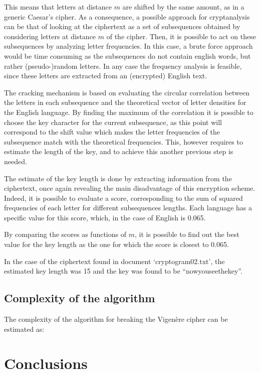 \documentclass[12pt]{article}
\begin{document}
This means that letters at distance $m$ are shifted by the same amount, as in a generic Caesar's cipher.
As a consequence, a possible approach for cryptanalysis can be that of looking at the ciphertext as a set of subsequences obtained by considering letters at distance $m$ of the cipher. 
Then, it is possible to act on these subsequences by analyzing letter frequencies. In this case, a brute force approach would be time consuming as the subsequences do not contain english words, but rather (pseudo-)random letters. 
In any case the frequency analysis is feasible, since these letters are extracted from an (encrypted) English text.

The cracking mechanism is based on evaluating the circular correlation between the letters in each subsequence and the theoretical vector of letter densities for the English language. 
By finding the maximum of the correlation it is possible to choose the key character for the current subsequence, as this point will correspond to the shift value which makes the letter frequencies of the subsequence match with the theoretical frequencies.
This, however requires to estimate the length of the key, and to achieve this another previous step is needed.

The estimate of the key length is done by extracting information from the ciphertext, once again revealing the main disadvantage of this encryption scheme.
Indeed, it is possible to evaluate a score, corresponding to the sum of squared frequencies of each letter for different subsequences lengths.
Each language has a specific value for this score, which, in the case of English is 0.065.

By comparing the scores as functions of $m$, it is possible to find out the best value for the key length as the one for which the score is closest to 0.065.

In the case of the ciphertext found in document `cryptogram02.txt', the estimated key length was 15 and the key was found to be ``nowyouseethekey''.

\subsection{Complexity of the algorithm}

The complexity of the algorithm for breaking the Vigenère cipher can be estimated as:

%

\section{Conclusions}


\pagebreak
\end{document}
